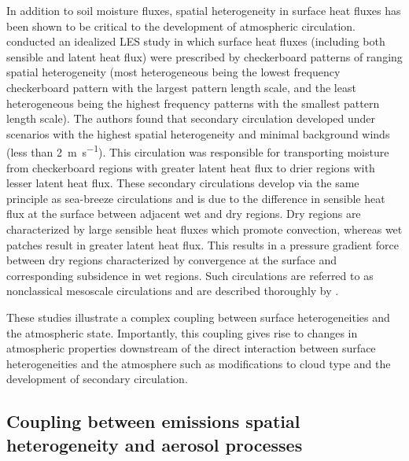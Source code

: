 In addition to soil moisture fluxes, spatial heterogeneity in surface heat fluxes has been shown to be critical to the development of atmospheric circulation. \textcite{lee_effect_2019} conducted an idealized LES study in which surface heat fluxes (including both sensible and latent heat flux) were prescribed by checkerboard patterns of ranging spatial heterogeneity (most heterogeneous being the lowest frequency checkerboard pattern with the largest pattern length scale, and the least heterogeneous being the highest frequency patterns with the smallest pattern length scale). The authors found that secondary circulation developed under scenarios with the highest spatial heterogeneity and minimal background winds (less than 2~\si{m.s^{-1}}). This circulation was responsible for transporting moisture from checkerboard regions with greater latent heat flux to drier regions with lesser latent heat flux. These secondary circulations develop via the same principle as sea-breeze circulations and is due to the difference in sensible heat flux at the surface between adjacent wet and dry regions. Dry regions are characterized by large sensible heat fluxes which promote convection, whereas wet patches result in greater latent heat flux. This results in a pressure gradient force between dry regions characterized by convergence at the surface and corresponding subsidence in wet regions. Such circulations are referred to as nonclassical mesoscale circulations and are described thoroughly by \textcite{segal_nonclassical_1992}.

These studies illustrate a complex coupling between surface heterogeneities and the atmospheric state. Importantly, this coupling gives rise to changes in atmospheric properties downstream of the direct interaction between surface heterogeneities and the atmosphere such as modifications to cloud type and the development of secondary circulation.   

\subsection{Coupling between emissions spatial heterogeneity and aerosol processes}\label{couple-emiss-sh-aerosol-process}

